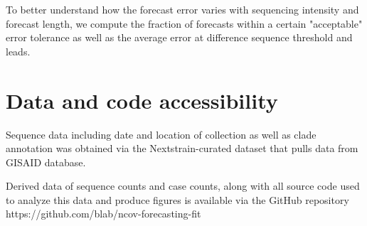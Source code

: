 \documentclass[11pt,oneside,letterpaper]{article}
\begin{document}
To better understand how the forecast error varies with sequencing intensity and forecast length, we compute the fraction of forecasts within a certain "acceptable" error tolerance as well as the average error at difference sequence threshold and leads.


\section*{Data and code accessibility}

Sequence data including date and location of collection as well as clade annotation was obtained via the Nextstrain-curated
dataset that pulls data from GISAID database. 


Derived data of sequence counts and case counts, along with all source code used to analyze
this data and produce figures is available via the GitHub repository https://github.com/blab/ncov-forecasting-fit




\end{document}
